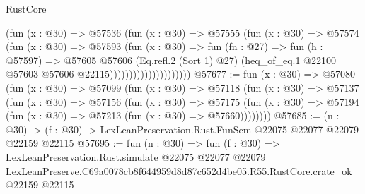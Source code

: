 \begin{lexlean}{RustCore}
\begin{coremodule}
                                  (fun (x : @30) =>
                                  @57536
                                    (fun (x : @30) =>
                                    @57555
                                      (fun (x : @30) =>
                                      @57574
                                        (fun (x : @30) =>
                                        @57593
                                          (fun (x : @30) =>
                                          fun (fn : @27) =>
                                          fun (h : @57597) =>
                                          @57605
                                            @57606
                                            (Eq.refl.{2} (Sort 1) @27)
                                            (heq_of_eq.{1}
                                              @22100
                                              @57603
                                              @57606
                                              @22115)))))))))))))))))))))
@57677 := fun (x : @30) =>
  @57080
    (fun (x : @30) =>
    @57099
      (fun (x : @30) =>
      @57118
        (fun (x : @30) =>
        @57137
          (fun (x : @30) =>
          @57156
            (fun (x : @30) =>
            @57175
              (fun (x : @30) => @57194 (fun (x : @30) => @57213 (fun (x : @30) => @57660))))))))
@57685 := (n : @30) ->
  (f : @30) -> LexLeanPreservation.Rust.FunSem @22075 @22077 @22079 @22159 @22115
@57695 := fun (n : @30) =>
  fun (f : @30) =>
  LexLeanPreservation.Rust.simulate
    @22075
    @22077
    @22079
    LexLeanPreserve.C69a0078cb8f644959d8d87c652d4be05.R55.RustCore.crate_ok
    @22159
    @22115
\end{coremodule}
\end{lexlean}
